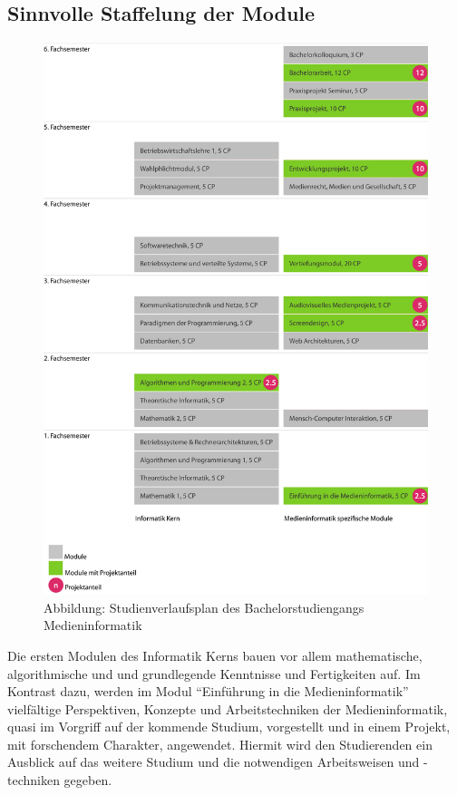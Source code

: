 \subsection{Sinnvolle Staffelung der
Module}\label{sinnvolle-staffelung-der-module}

\begin{figure}[htbp][htbp]
\centering
\includegraphics[width=\columnwidth]{../anhaenge/bilder/ba-verlaufsplan.png}
\caption{Abbildung: Studienverlaufsplan des Bachelorstudiengangs
Medieninformatik}
\end{figure}

Die ersten Modulen des Informatik Kerns bauen vor allem mathematische,
algorithmische und und grundlegende Kenntnisse und Fertigkeiten auf. Im
Kontrast dazu, werden im Modul ``Einführung in die Medieninformatik''
vielfältige Perspektiven, Konzepte und Arbeitstechniken der
Medieninformatik, quasi im Vorgriff auf der kommende Studium,
vorgestellt und in einem Projekt, mit forschendem Charakter, angewendet.
Hiermit wird den Studierenden ein Ausblick auf das weitere Studium und
die notwendigen Arbeitsweisen und -techniken gegeben.

